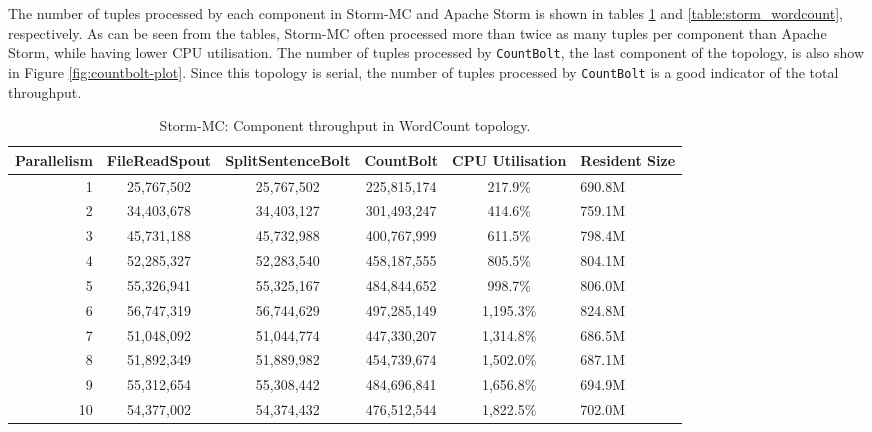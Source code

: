 The number of tuples processed by each component in Storm-MC and Apache Storm is shown in tables \ref{table:storm_mc_wordcount} and \ref{table:storm_wordcount}, respectively. As can be seen from the tables, Storm-MC often processed more than twice as many tuples per component than Apache Storm, while having lower CPU utilisation. The number of tuples processed by \texttt{CountBolt}, the last component of the topology, is also show in Figure \ref{fig:countbolt-plot}. Since this topology is serial, the number of tuples processed by \texttt{CountBolt} is a good indicator of the total throughput.

\begin{table}[!htb]
\begin{adjustwidth}{-0.5in}{-0.5in}
\centering
\small
\begin{tabular}{@{}rccccl@{}}
    \textbf{Parallelism} & \textbf{FileReadSpout} & \textbf{SplitSentenceBolt} & \textbf{CountBolt} & \textbf{CPU Utilisation} & \textbf{Resident Size} \\ \toprule
    1 & {25,767,502} & {25,767,502} & {225,815,174} & {217.9\%} & {690.8M} \\
    2 & {34,403,678} & {34,403,127} & {301,493,247} & {414.6\%} & {759.1M} \\
    3 & {45,731,188} & {45,732,988} & {400,767,999} & {611.5\%} & {798.4M} \\
    4 & {52,285,327} & {52,283,540} & {458,187,555} & {805.5\%} & {804.1M} \\
	5 & {55,326,941} & {55,325,167} & {484,844,652} & {998.7\%} & {806.0M} \\
	6 & {56,747,319} & {56,744,629} & {497,285,149} & {1,195.3\%} & {824.8M} \\
	7 & {51,048,092} & {51,044,774} & {447,330,207} & {1,314.8\%} & {686.5M} \\
	8 & {51,892,349} & {51,889,982} & {454,739,674} & {1,502.0\%} & {687.1M} \\
	9 & {55,312,654} & {55,308,442} & {484,696,841} & {1,656.8\%} & {694.9M} \\
	10 & {54,377,002} & {54,374,432} & {476,512,544} & {1,822.5\%} & {702.0M} \\
\end{tabular}
\caption{Storm-MC: Component throughput in WordCount topology.}
\label{table:storm_mc_wordcount}
\end{adjustwidth}
\end{table}

